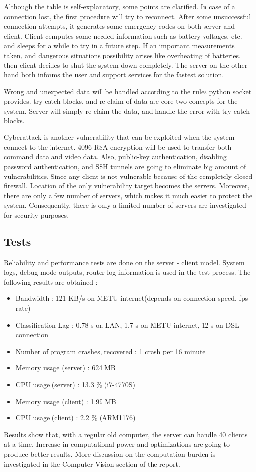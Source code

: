 Although the table is self-explanatory, some points are clarified. In case of a connection lost, the first procedure will try to reconnect. After some unsuccessful connection attempts, it generates some emergency codes on both server and client. Client computes some needed information such as battery voltages, etc. and sleeps for a while to try in a future step. If an important measurements taken, and dangerous situations possibility arises like overheating of batteries, then client decides to shut the system down completely. The server on the other hand both informs the user and support services for the fastest solution.

Wrong and unexpected data will be handled according to the rules python socket provides. try-catch blocks, and re-claim of data are core two concepts for the system. Server will simply re-claim the data, and handle the error with try-catch blocks.

Cyberattack is another vulnerability that can be exploited when the system connect to the internet. 4096 RSA encryption will be used to transfer both command data and video data. Also, public-key authentication, disabling password authentication, and SSH tunnels are going to eliminate big amount of vulnerabilities. Since any client is not vulnerable because of the completely closed firewall. Location of the only vulnerability target becomes the servers. Moreover, there are only a few number of servers, which makes it much easier to protect the system. Consequently, there is only a limited number of servers are investigated for security purposes.


\subsection{Tests}
Reliability and performance tests are done on the server - client model. System logs, debug mode outputs, router log information is used in the test process. The following results are obtained :

\begin{itemize}
    \item Bandwidth : 121 KB/s on METU internet(depends on connection speed, fps rate)
    \item Classification Lag : 0.78 s on LAN, 1.7 s on METU internet, 12 s on DSL connection
    \item Number of program crashes, recovered : 1 crash per 16 minute
    \item Memory usage (server) : 624 MB
    \item CPU usage (server) : 13.3 \% (i7-4770S)
    \item Memory usage (client) : 1.99 MB
    \item CPU usage (client) : 2.2 \% (ARM1176)
\end{itemize}

Results show that, with a regular old computer, the server can handle 40 clients at a time. Increase in computational power and optimizations are going to produce better results. More discussion on the computation burden is investigated in the Computer Vision section of the report.